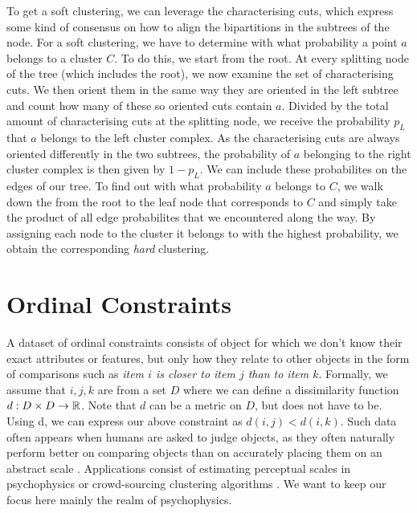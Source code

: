 To get a soft clustering, we can leverage the characterising cuts, which express some kind of consensus on how to align the bipartitions in the subtrees of the node. 
For a soft clustering, we have to determine with what probability a point $a$ belongs to a cluster $C$. 
To do this, we start from the root. At every splitting node of the tree (which includes the root), we now examine the set of characterising cuts.
We then orient them in the same way they are oriented in the left subtree and count how many of these so oriented cuts contain $a$. Divided by the total amount of characterising cuts at the
splitting node, we receive the probability $p_L$ that $a$ belongs to the left cluster complex. As the characterising cuts are always oriented differently in the two subtrees, the probability
of $a$ belonging to the right cluster complex is then given by $1 - p_L$. We can include these probabilites on the edges of our tree. 
To find out with what probability $a$ belongs to $C$, we
walk down the from the root to the leaf node that corresponds to $C$ and simply take the product of all edge probabilites that we encountered along the way.
By assigning each node to the cluster it belongs to with the highest probability, we obtain the corresponding \textit{hard} clustering.
    

\section{Ordinal Constraints}
A dataset of ordinal constraints consists of object for which we don't know their exact attributes or features, but only how they relate to other objects
in the form of comparisons such as \textit{item $i$ is closer to item $j$ than to item $k$}. Formally, we assume that $i, j, k$ are from 
a set $D$ where we can define a dissimilarity function $d: D \times D \to \mathbb{R}$. Note that $d$ can be a metric on $D$, but does not have to be.
Using d, we can express our above constraint as $d(i, j) < d(i, k)$. Such data often appears when humans are asked to judge objects, as they often naturally perform better on comparing objects
than on accurately placing them on an abstract scale \citep{stewartAbsoluteIdentificationRelative2005}. Applications consist of estimating perceptual scales in psychophysics 
\citep{haghiriEstimationPerceptualScales2020} or crowd-sourcing clustering algorithms \citep{ukkonenCrowdsourcedCorrelationClustering2017}. 
We want to keep our focus here mainly the realm of psychophysics.


